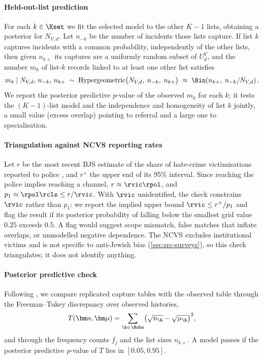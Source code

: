 \paragraph{Held-out-list prediction}
For each $k\in\Kset$ we fit the selected model to the other $K-1$ lists, obtaining a posterior for $N_{V,d}$. Let $n_{-k}$ be the number of incidents those lists capture. If list $k$ captures incidents with a common probability, independently of the other lists, then given $n_{k+}$ its captures are a uniformly random subset of $U^V_d$, and the number $m_k$ of list-$k$ records linked to at least one other list satisfies
\begin{equation}\label{eq:plan-holdout}
  m_k \mid N_{V,d},\,n_{-k},\,n_{k+} \;\sim\; \operatorname{Hypergeometric}\bigl(N_{V,d},\; n_{-k},\; n_{k+}\bigr)\;\approx\;\Bin\!\left(n_{k+},\; n_{-k}/N_{V,d}\right).
\end{equation}
We report the posterior predictive $p$-value of the observed $m_k$ for each $k$; it tests the $(K-1)$-list model and the independence and homogeneity of list $k$ jointly, a small value (excess overlap) pointing to referral and a large one to specialisation.

\paragraph{Triangulation against NCVS reporting rates}
Let $r$ be the most recent BJS estimate of the share of hate-crime victimisations reported to police \citep{bjs2021hate}, and $r^{+}$ the upper end of its 95\% interval. Since reaching the police implies reaching a channel, $r\approx\rvic\rpol$, and $p_1\approx\rpol\rcls\le r/\rvic$. With $\rvic$ unidentified, the check constrains $\rvic$ rather than $p_1$: we report the implied upper bound $\rvic\le r^{+}/p_1$ and flag the result if its posterior probability of falling below the smallest grid value $0.25$ exceeds $0.5$. A flag would suggest scope mismatch, false matches that inflate overlaps, or unmodelled negative dependence. The NCVS excludes institutional victims and is not specific to anti-Jewish bias (\cref{sec:src-surveys}), so this check triangulates; it does not identify anything.

\paragraph{Posterior predictive check}
Following \citet{gelman2013}, we compare replicated capture tables with the observed table through the Freeman--Tukey discrepancy over observed histories,
\begin{equation}\label{eq:plan-ft}
  T(\bm n,\bm\mu)=\sum_{\h\in\Hobs}\bigl(\sqrt{n_{\h}}-\sqrt{\mu_{\h}}\bigr)^2,
\end{equation}
and through the frequency counts $f_j$ and the list sizes $n_{k+}$. A model passes if the posterior predictive $p$-value of $T$ lies in $[0.05,0.95]$.

